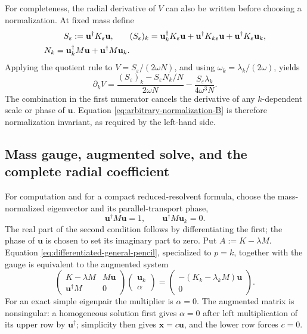 For completeness, the radial derivative of \(V\) can also be written before
choosing a normalization.  At fixed mass define
\begin{align}
  S_\varepsilon:=\mathbf u^\dagger K_\varepsilon\mathbf u,
  \qquad&
  (S_\varepsilon)_k
  =\mathbf u_k^\dagger K_\varepsilon\mathbf u
   +\mathbf u^\dagger K_{k\varepsilon}\mathbf u
   +\mathbf u^\dagger K_\varepsilon\mathbf u_k,
  \notag\\
  N_k=\mathbf u_k^\dagger M\mathbf u
      +\mathbf u^\dagger M\mathbf u_k.&
  \label{eq:arbitrary-normalization-radial-ingredients}
\end{align}
Applying the quotient rule to
\(V=S_\varepsilon/(2\omega N)\), and using
\(\omega_k=\lambda_k/(2\omega)\), yields
\begin{equation}
  \partial_kV
  =\frac{(S_\varepsilon)_k-S_\varepsilon N_k/N}{2\omega N}
   -\frac{S_\varepsilon\lambda_k}{4\omega^3N}.
  \label{eq:arbitrary-normalization-B}
\end{equation}
The combination in the first numerator cancels the derivative of any
\(k\)-dependent scale or phase of \(\mathbf u\).  Equation
\eqref{eq:arbitrary-normalization-B} is therefore normalization invariant,
as required by the left-hand side.

\subsection{Mass gauge, augmented solve, and the complete radial coefficient}

For computation and for a compact reduced-resolvent formula, choose the
mass-normalized eigenvector and its parallel-transport phase,
\begin{equation}
  \mathbf u^\dagger M\mathbf u=1,
  \qquad
  \mathbf u^\dagger M\mathbf u_k=0.
  \label{eq:mass-normalized-parallel-gauge}
\end{equation}
The real part of the second condition follows by differentiating the first;
the phase of \(\mathbf u\) is chosen to set its imaginary part to zero.  Put
\(A:=K-\lambda M\).  Equation
\eqref{eq:differentiated-general-pencil}, specialized to \(p=k\), together
with the gauge is equivalent to the augmented system
\begin{equation}
  \begin{pmatrix}
    K-\lambda M & M\mathbf u\\
    \mathbf u^\dagger M & 0
  \end{pmatrix}
  \begin{pmatrix}\mathbf u_k\\ \alpha\end{pmatrix}
  =
  \begin{pmatrix}
    -(K_k-\lambda_kM)\mathbf u\\ 0
  \end{pmatrix}.
  \label{eq:augmented-mode-derivative}
\end{equation}
For an exact simple eigenpair the multiplier is \(\alpha=0\).  The augmented
matrix is nonsingular: a homogeneous solution first gives
\(\alpha=0\) after left multiplication of its upper row by
\(\mathbf u^\dagger\); simplicity then gives
\(\mathbf x=c\mathbf u\), and the lower row forces \(c=0\).

